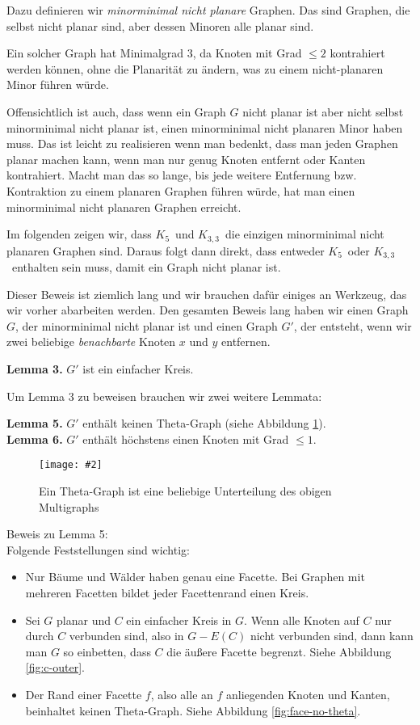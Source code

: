 \documentclass[10pt,a4paper]{article}
\makeatletter
\def\maxwidth#1{\ifdim\Gin@nat@width>#1 #1\else\Gin@nat@width\fi}
\newcommand{\imageFigure}[4]{%
    \begin{figure}[h]%
        \centering%
        {%
            \setlength{\fboxsep}{1pt}%
            \setlength{\fboxrule}{1pt}%
            \texttt{[image: \#2]}%
        }%
        \caption{#1}%
        \label{fig:#4}%
    \end{figure}%
}
\newcommand{\Kf}{$K_5$}
\newcommand{\Kdd}{$K_{3,3}$}
\makeatother
\begin{document}
Dazu definieren wir \textit{minorminimal nicht planare} Graphen.
Das sind Graphen, die selbst nicht planar sind, aber dessen Minoren alle planar
sind.

Ein solcher Graph hat Minimalgrad 3, da Knoten mit Grad $\leq 2$ kontrahiert
werden können, ohne die Planarität zu ändern, was zu einem nicht-planaren Minor
führen würde.

Offensichtlich ist auch, dass wenn ein Graph $G$ nicht planar ist aber nicht
selbst minorminimal nicht planar ist, einen minorminimal nicht planaren Minor
haben muss.
Das ist leicht zu realisieren wenn man bedenkt, dass man jeden Graphen planar
machen kann, wenn man nur genug Knoten entfernt oder Kanten kontrahiert.
Macht man das so lange, bis jede weitere Entfernung bzw. Kontraktion zu einem
planaren Graphen führen würde, hat man einen minorminimal nicht planaren
Graphen erreicht.

Im folgenden zeigen wir, dass \Kf~und \Kdd~die einzigen minorminimal nicht
planaren Graphen sind.
Daraus folgt dann direkt, dass entweder \Kf~oder \Kdd~enthalten sein muss,
damit ein Graph nicht planar ist.

Dieser Beweis ist ziemlich lang und wir brauchen dafür einiges an Werkzeug, das
wir vorher abarbeiten werden.
Den gesamten Beweis lang haben wir einen Graph $G$, der minorminimal nicht
planar ist und einen Graph $G'$, der entsteht, wenn wir zwei beliebige
\textit{benachbarte} Knoten $x$ und $y$ entfernen.

\textbf{Lemma 3.} $G'$ ist ein einfacher Kreis.

Um Lemma 3 zu beweisen brauchen wir zwei weitere Lemmata:

\textbf{Lemma 5.} $G'$ enthält keinen Theta-Graph (siehe Abbildung
\ref{fig:theta}).\\
\textbf{Lemma 6.} $G'$ enthält höchstens einen Knoten mit Grad $\leq 1$.

\imageFigure{Ein Theta-Graph ist eine beliebige Unterteilung des obigen
Multigraphs}{theta.png}{.3}{theta}

Beweis zu Lemma 5:\\
Folgende Feststellungen sind wichtig:
\begin{itemize}
    \item Nur Bäume und Wälder haben genau eine Facette.
        Bei Graphen mit mehreren Facetten bildet jeder Facettenrand einen
        Kreis.
    \item Sei $G$ planar und $C$ ein einfacher Kreis in $G$.
        Wenn alle Knoten auf $C$ nur durch $C$ verbunden sind, also in $G-E(C)$
        nicht verbunden sind, dann kann man $G$ so einbetten, dass $C$ die
        äußere Facette begrenzt. Siehe Abbildung \ref{fig:c-outer}.
    \item Der Rand einer Facette $f$, also alle an $f$ anliegenden Knoten und
        Kanten, beinhaltet keinen Theta-Graph. Siehe Abbildung
        \ref{fig:face-no-theta}.
\end{itemize}
\end{document}
